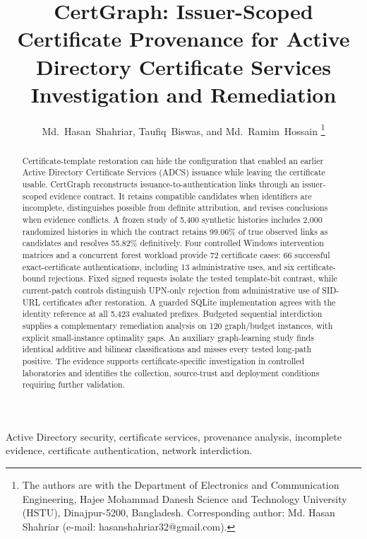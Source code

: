 \documentclass[journal]{IEEEtran}
\title{CertGraph: Issuer-Scoped Certificate Provenance for Active Directory Certificate Services Investigation and Remediation}
\author{Md.~Hasan~Shahriar, Taufiq~Biswas, and Md.~Ramim~Hossain%
\thanks{The authors are with the Department of Electronics and Communication Engineering, Hajee Mohammad Danesh Science and Technology University (HSTU), Dinajpur-5200, Bangladesh. Corresponding author: Md. Hasan Shahriar (e-mail: hasanshahriar32@gmail.com).}}
\begin{document}
\maketitle

\begin{abstract}
Certificate-template restoration can hide the configuration that enabled an earlier Active Directory Certificate Services (ADCS) issuance while leaving the certificate usable. CertGraph reconstructs issuance-to-authentication links through an issuer-scoped evidence contract. It retains compatible candidates when identifiers are incomplete, distinguishes possible from definite attribution, and revises conclusions when evidence conflicts. A frozen study of 5,400 synthetic histories includes 2,000 randomized histories in which the contract retains 99.06\% of true observed links as candidates and resolves 55.82\% definitively. Four controlled Windows intervention matrices and a concurrent forest workload provide 72 certificate cases: 66 successful exact-certificate authentications, including 13 administrative uses, and six certificate-bound rejections. Fixed signed requests isolate the tested template-bit contrast, while current-patch controls distinguish UPN-only rejection from administrative use of SID-URL certificates after restoration. A guarded SQLite implementation agrees with the identity reference at all 5,423 evaluated prefixes. Budgeted sequential interdiction supplies a complementary remediation analysis on 120 graph/budget instances, with explicit small-instance optimality gaps. An auxiliary graph-learning study finds identical additive and bilinear classifications and misses every tested long-path positive. The evidence supports certificate-specific investigation in controlled laboratories and identifies the collection, source-trust and deployment conditions requiring further validation.
\end{abstract}

\begin{IEEEkeywords}
Active Directory security, certificate services, provenance analysis, incomplete evidence, certificate authentication, network interdiction.
\end{IEEEkeywords}









\appendices





\end{document}
